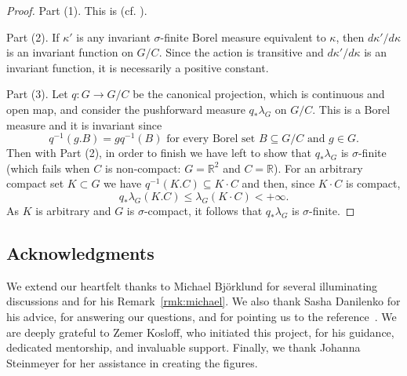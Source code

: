 \documentclass{amsart}
\numberwithin{equation}{subsection}
\begin{document}
\begin{proof}
Part (1). This is \cite[Theorem 1.1]{mackey1952induced} (cf. \cite[Theorem 7.1 and its Corollary]{mackey1957borel}).

Part (2). If \(\kappa'\) is any invariant \(\sigma\)-finite Borel measure equivalent to \(\kappa\), then \(d\kappa'/d\kappa\) is an invariant function on \(G/C\). Since the action is transitive and \(d\kappa'/d\kappa\) is an invariant function, it is necessarily a positive constant.

Part (3). Let \(q:G\to G/C\) be the canonical projection, which is continuous and open map, and consider the pushforward measure \(q_{\ast}\lambda_{G}\) on \(G/C\). This is a Borel measure and it is invariant since
\[q^{-1}\left(g.B\right)=gq^{-1}\left(B\right)\text{ for every Borel set }B\subseteq G/C\text{ and }g\in G.\]
Then with Part (2), in order to finish we have left to show that \(q_{\ast}\lambda_{G}\) is \(\sigma\)-finite (which fails when \(C\) is non-compact: \(G=\mathbb{R}^{2}\) and \(C=\mathbb{R}\)). For an arbitrary compact set \(K\subset G\) we have \(q^{-1}\left(K.C\right)\subseteq K\cdot C\) and then, since \(K\cdot C\) is compact,
\[q_{\ast}\lambda_{G}\left(K.C\right)\leq\lambda_{G}\left(K\cdot C\right)<+\infty.\]
As \(K\) is arbitrary and \(G\) is \(\sigma\)-compact, it follows that \(q_{\ast}\lambda_{G}\) is \(\sigma\)-finite.
\end{proof}

\subsection*{Acknowledgments}

We extend our heartfelt thanks to Michael Bj\"{o}rklund for several illuminating discussions and for his Remark~\ref{rmk:michael}. We also thank Sasha Danilenko for his advice, for answering our questions, and for pointing us to the reference~\cite{feldman1978orbit}. We are deeply grateful to Zemer Kosloff, who initiated this project, for his guidance, dedicated mentorship, and invaluable support. Finally, we thank Johanna Steinmeyer for her assistance in creating the figures.



\end{document}
